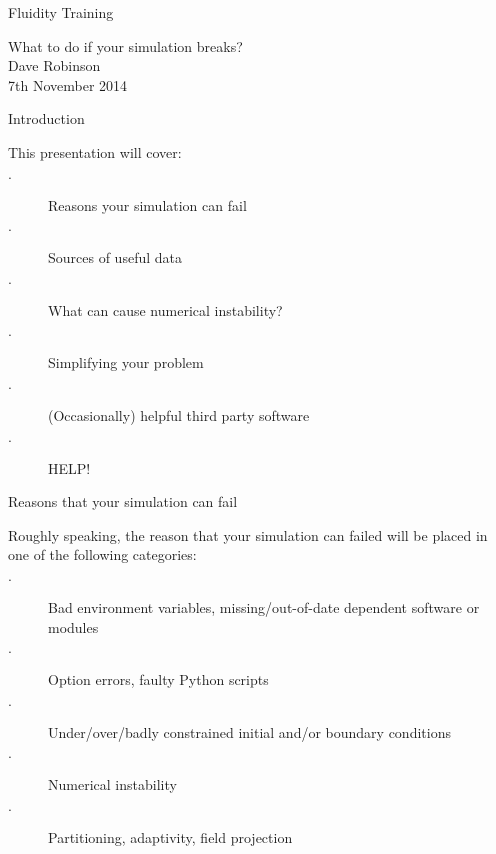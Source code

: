 \documentclass[professionalfonts, 8pt]{beamer}
\begin{document}

\begin{frame}{Fluidity Training}
  \begin{center}
  {\Huge What to do if your simulation breaks?}
  \vspace{1.5cm}\\
  \large Dave Robinson\\
  \vspace{0.2cm}
  7th November 2014
  \end{center}
\end{frame}

\begin{frame}{Introduction}

This presentation will cover:
\vspace{1ex}
\begin{description}
 \item[$\cdot$] Reasons your simulation can fail
 \item[$\cdot$] Sources of useful data
 \item[$\cdot$] What can cause numerical instability?
 \item[$\cdot$] Simplifying your problem
 \item[$\cdot$] (Occasionally) helpful third party software 
 \item[$\cdot$] HELP!
\end{description}
\end{frame}


\begin{frame}{Reasons that your simulation can fail}

Roughly speaking, the reason that your simulation can failed will be placed in one of the following categories:
\vspace{1ex}

\begin{description}
 \item[$\cdot$] Bad environment variables, missing/out-of-date dependent software or modules
 \item[$\cdot$] Option errors, faulty Python scripts
 \item[$\cdot$] Under/over/badly constrained initial and/or boundary conditions
 \item[$\cdot$] Numerical instability
 \item[$\cdot$] Partitioning, adaptivity, field projection
\end{description}

\end{frame}
\end{document}
